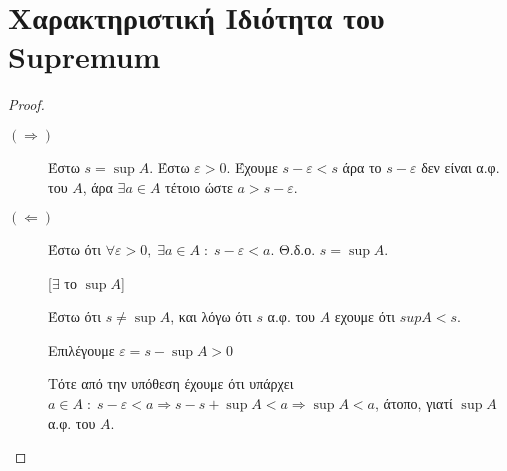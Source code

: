 \documentclass[main.tex]{subfiles}
\begin{document}
\section{Χαρακτηριστική Ιδιότητα του Supremum}


 \begin{proof}
 \item {}
     \begin{description}
         \item[$ (\Rightarrow) $] 
             Έστω $ s = \sup A $. Έστω $ \varepsilon >0 $. Έχουμε $ 
             s - \varepsilon < s $ άρα το $ s- \varepsilon $ δεν είναι 
             α.φ. του $A$, άρα $ \exists a \in A $ τέτοιο ώστε $ 
             a > s- \varepsilon$. 

         \item [$ (\Leftarrow) $] 
             Έστω ότι $ \forall \varepsilon >0, \; \exists a \in A \; : 
             \; s- \varepsilon < a$. Θ.δ.ο. $ s = \sup A $. 


             \begin{minipage}{0.23\textwidth}
             \end{minipage}

             [$ \exists $ το $ \sup A $]

             Έστω ότι $ s \neq \sup A $, και λόγω ότι $ s $ α.φ. του $A$ 
             εχουμε ότι $sup A < s $. 

             Επιλέγουμε $ \varepsilon = s - \sup A > 0 $

             Τότε από την υπόθεση έχουμε ότι 
             υπάρχει $ a \in A \; : \; s - \varepsilon < a \Rightarrow s 
             - s + \sup A < a \Rightarrow \sup A < a $, άτοπο, γιατί 
             $ \sup A $ α.φ. του $A$.  
     \end{description} 
 \end{proof}

 
\end{document}
